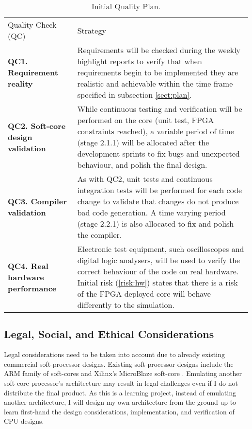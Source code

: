 \begin{table}[h]
    \begin{tabularx}{\textwidth}{|l|X|}
    \hline
    Quality Check (QC) & Strategy \\
	\specialrule{2pt}{-2pt}{0pt}
	\textbf{QC1. Requirement reality} & Requirements will be checked during the weekly highlight reports to verify that when requirements begin to be implemented they are realistic and achievable within the time frame specified in subsection \ref{sect:plan}.
	\\ \hline
	
	\textbf{QC2. Soft-core design validation} & While continuous testing and verification will be performed on the core (unit test, FPGA constraints reached), a variable period of time (stage 2.1.1) will be allocated after the development sprints to fix bugs and unexpected behaviour, and polish the final design. 
	\\ \hline
	
	\textbf{QC3. Compiler validation} & As with QC2, unit tests and continuous integration tests will be performed for each code change to validate that changes do not produce bad code generation. A time varying period (stage 2.2.1) is also allocated to fix and polish the compiler.
	\\ \hline
	
	\textbf{QC4. Real hardware performance} & Electronic test equipment, such oscilloscopes and digital logic analysers, will be used to verify the correct behaviour of the code on real hardware. Initial risk (\ref{risk:hw}) states that there is a risk of the FPGA deployed core will behave differently to the simulation.
	\\ \hline
    \end{tabularx}
    \caption{Initial Quality Plan.}
\end{table}


\subsection*{Legal, Social, and Ethical Considerations}\label{sect:legal}
Legal considerations need to be taken into account due to already existing commercial soft-processor designs. Existing soft-processor designs include the ARM family of soft-cores \citep{arm} and Xilinx's MicroBlaze soft-core \citep{microblaze}. Emulating another soft-core processor's architecture may result in legal challenges even if I do not distribute the final product. As this is a learning project, instead of emulating another architecture, I will design my own architecture from the ground up to learn first-hand the design considerations, implementation, and verification of CPU designs.


